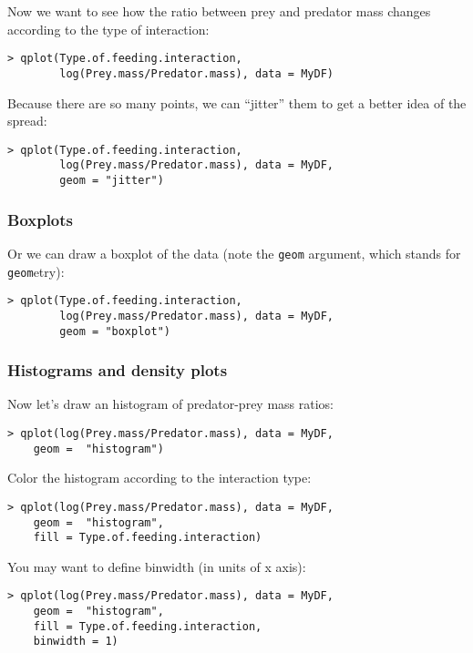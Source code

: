 Now we want to see how the ratio between prey and predator mass changes 
according to the type of interaction:

\begin{lstlisting}
> qplot(Type.of.feeding.interaction, 
		log(Prey.mass/Predator.mass), data = MyDF)
\end{lstlisting}

Because there are so many points, we can ``jitter'' them to get a
better idea of the spread:

\begin{lstlisting}
> qplot(Type.of.feeding.interaction, 
		log(Prey.mass/Predator.mass), data = MyDF,
		geom = "jitter")
\end{lstlisting}

\subsubsection{Boxplots}

Or we can draw a boxplot of the data (note the {\tt geom} argument, 
which stands for {\tt geom}etry):

\begin{lstlisting}
> qplot(Type.of.feeding.interaction, 
		log(Prey.mass/Predator.mass), data = MyDF,
		geom = "boxplot")
\end{lstlisting}

\subsubsection{Histograms and density plots}

Now let's draw an histogram of predator-prey mass ratios:

\begin{lstlisting}
> qplot(log(Prey.mass/Predator.mass), data = MyDF, 
	geom =  "histogram")
\end{lstlisting}

Color the histogram according to the interaction type:

\begin{lstlisting}
> qplot(log(Prey.mass/Predator.mass), data = MyDF, 
	geom =  "histogram", 
	fill = Type.of.feeding.interaction)
\end{lstlisting}

You may want to define binwidth (in units of x axis):

\begin{lstlisting}
> qplot(log(Prey.mass/Predator.mass), data = MyDF, 
	geom =  "histogram", 
	fill = Type.of.feeding.interaction,
	binwidth = 1)
\end{lstlisting}

